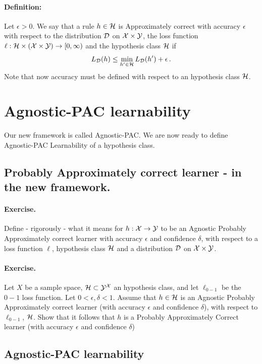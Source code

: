 \paragraph{Definition:}
Let $\epsilon>0$.
We say that a rule $h\in\mathcal{H}$ is Approximately correct with accuracy $\epsilon$
with respect to the distribution $\mathcal{D}$ on $\mathcal{X}\times \mathcal{Y}$, the loss function
$\ell:\mathcal{H}\times (\mathcal{X} \times\mathcal{Y})\to[0,\infty)$ and the hypothesis class $\mathcal{H}$ 
if 
\[
  L_{\mathcal{D}}(h) \leq \min_{h'\in\mathcal{H}} L_{\mathcal{D}}(h') + \epsilon\,.
\]
Note that now accuracy must be defined with respect to an hypothesis class
$\mathcal{H}$.



 \section{Agnostic-PAC learnability}
 Our new framework is called Agnostic-PAC.
 We are now ready to define Agnostic-PAC Learnability of a hypothesis class.

\subsection{Probably Approximately correct learner - in the new framework.}

\paragraph{Exercise.} Define - rigorously - what it means for $h:\mathcal{X}\to\mathcal{Y}$ to be
an Agnostic Probably Approximately correct learner with accuracy $\epsilon$ and confidence
$\delta$, with respect to a loss function $\ell$, hypothesis class $\mathcal{H}$ and a
distribution $\mathcal{D}$ on $\mathcal{X}\times\mathcal{Y}$.
~\\
\paragraph{Exercise.} Let $X$ be a sample space, $\mathcal{H}\subset \mathcal{Y}^{\mathcal{X}}$ an
hypothesis class, and let $\ell_{0-1}$ be the $0-1$ loss function. Let
$0<\epsilon,\delta<1$. Assume that
$h\in\mathcal{H}$ is an Agnostic Probably Approximately correct learner (with accuracy $\epsilon$ and confidence
$\delta$), with  respect to $\ell_{0-1}$, $\mathcal{H}$. Show that it follows
that $h$ is a Probably Approximately Correct learner (with accuracy $\epsilon$ and confidence
$\delta$)


\subsection{Agnostic-PAC learnability}

